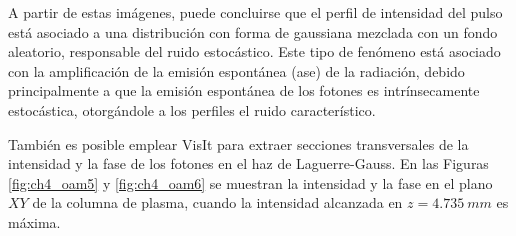 A partir de estas imágenes, puede concluirse que el perfil de intensidad del pulso está asociado a una distribución con forma de gaussiana mezclada con un fondo aleatorio, responsable del ruido estocástico. Este tipo de fenómeno está asociado con la amplificación de la emisión espontánea (\acrshort{ase}) de la radiación, debido principalmente a que la emisión espontánea de los fotones es intrínsecamente estocástica, otorgándole a los perfiles el ruido característico.

También es posible emplear VisIt para extraer secciones transversales de la intensidad y la fase de los fotones en el haz de Laguerre-Gauss. En las Figuras \ref{fig:ch4_oam5} y \ref{fig:ch4_oam6} se muestran la intensidad y la fase en el plano $XY$ de la columna de plasma, cuando la intensidad alcanzada en $z=\qty{4.735}{mm}$ es máxima.

